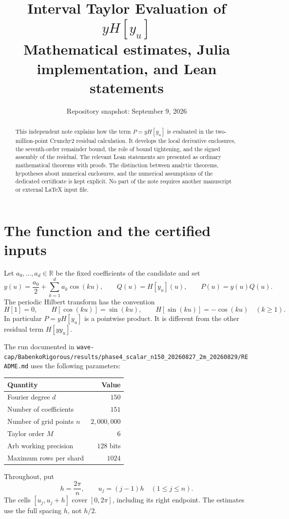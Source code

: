 \documentclass[11pt]{article}
\title{Interval Taylor Evaluation of \texorpdfstring{$yH[y_u]$}{yH[yu]}\\
  \large Mathematical estimates, Julia implementation, and Lean statements}
\author{}
\date{Repository snapshot: September 9, 2026}
\theoremstyle{definition}
\theoremstyle{remark}
\newcommand{\R}{\mathbb R}
\newcommand{\code}[1]{\nolinkurl{#1}}
\numberwithin{equation}{section}
\begin{document}
\maketitle
\begin{abstract}
This independent note explains how the term $P=yH[y_u]$ is evaluated in the
two-million-point Crunchy2 residual calculation. It develops the local
derivative enclosures, the seventh-order remainder bound, the role of bound
tightening, and the signed assembly of the residual. The relevant Lean
statements are presented as ordinary mathematical theorems with proofs.
The distinction between analytic theorems, hypotheses about numerical
enclosures, and the numerical assumptions of the dedicated certificate is
kept explicit. No part of the note requires another manuscript or external
LaTeX input file.
\end{abstract}

\section{The function and the certified inputs}
\label{sec:inputs}

Let $a_0,\ldots,a_d\in\R$ be the fixed coefficients of the candidate and set
\begin{equation}
 y(u)=\frac{a_0}{2}+\sum_{k=1}^{d}a_k\cos(ku),\qquad
 Q(u)=H[y_u](u),\qquad P(u)=y(u)Q(u).
 \label{eq:profile}
\end{equation}
The periodic Hilbert transform has the convention
\begin{equation}
 H[1]=0,\qquad H[\cos(ku)]=\sin(ku),\qquad
 H[\sin(ku)]=-\cos(ku)\quad(k\geq1).
 \label{eq:hilbert-convention}
\end{equation}
In particular $P=yH[y_u]$ is a pointwise product. It is different from the
other residual term $H[yy_u]$.

The run documented in
\code{wave-cap/BabenkoRigorous/results/phase4_scalar_n150_20260827_2m_20260829/README.md}
uses the following parameters:
\begin{center}
\begin{tabular}{lr}
\toprule
Quantity & Value\\
\midrule
Fourier degree $d$ & $150$\\
Number of coefficients & $151$\\
Number of grid points $n$ & $2{,}000{,}000$\\
Taylor order $M$ & $6$\\
Arb working precision & $128$ bits\\
Maximum rows per shard & $1024$\\
\bottomrule
\end{tabular}
\end{center}
Throughout, put
\begin{equation}
 h=\frac{2\pi}{n},\qquad u_j=(j-1)h\quad(1\leq j\leq n).
 \label{eq:grid}
\end{equation}
The cells $[u_j,u_j+h]$ cover $[0,2\pi]$, including its right endpoint.
The estimates use the full spacing $h$, not $h/2$.
\end{document}
